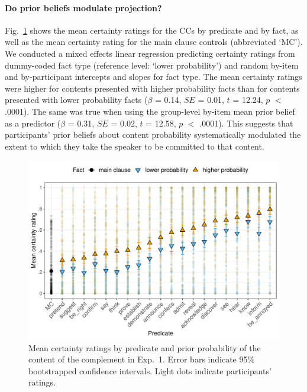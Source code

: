\documentclass[11pt,fleqn]{article}
\newcommand{\figref}[1]{Fig.~\ref{#1}}
\newcommand{\6}{\mbox{$[\hspace*{-.6mm}[$}}
\newcommand{\9}{\mbox{$]\hspace*{-.6mm}]$}}
\begin{document}
\paragraph{Do prior beliefs modulate projection?}  \figref{f-projection-mean} shows the mean certainty ratings for the CCs by  predicate and by fact, as well as the mean certainty rating for the main clause controls (abbreviated `MC'). We conducted a mixed effects linear regression predicting certainty ratings from dummy-coded fact type (reference level: `lower probability') and random by-item and by-participant intercepts and slopes for fact type. The mean certainty ratings were higher for contents  presented with higher probability facts than for contents presented with lower probability facts ($\beta$ = 0.14, $SE$ = 0.01, $t$ = 12.24, $p$ $<$ .0001).   The same was true when using the group-level by-item mean prior belief as a predictor  ($\beta$ = 0.31, $SE$ = 0.02, $t$ = 12.58, $p$ $<$ .0001).   This suggests that participants' prior beliefs about content probability systematically modulated the extent to which they take the speaker to be committed to that content.

\begin{figure}[h!]
\centering

\includegraphics[width=.7\paperwidth]{../../results/9-prior-projection/graphs/means-projectivity-by-predicate-and-prior}

\caption{Mean certainty ratings by predicate and prior probability of the content of the complement in Exp.~1. Error bars indicate 95\% bootstrapped confidence intervals. Light dots indicate participants' ratings.} 
\label{f-projection-mean}
\end{figure}
\end{document}
